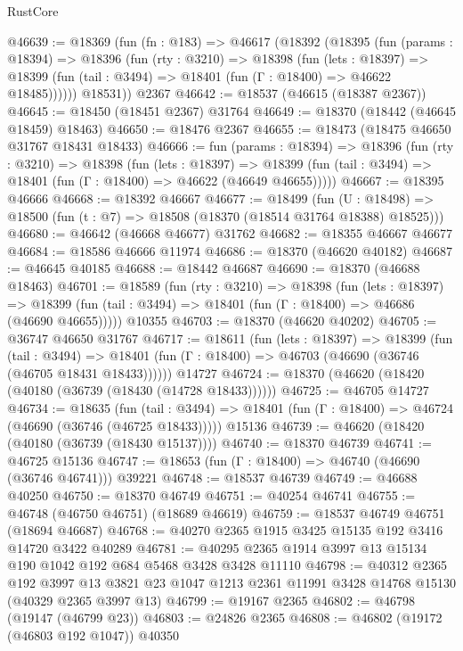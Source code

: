 \begin{lexlean}{RustCore}
\begin{coremodule}
@46639 := @18369
    (fun (fn : @183) =>
    @46617
      (@18392
        (@18395
          (fun (params : @18394) =>
          @18396
            (fun (rty : @3210) =>
            @18398
              (fun (lets : @18397) =>
              @18399 (fun (tail : @3494) => @18401 (fun (Γ : @18400) => @46622 @18485))))))
        @18531))
    @2367
@46642 := @18537 (@46615 (@18387 @2367))
@46645 := @18450 (@18451 @2367) @31764
@46649 := @18370 (@18442 (@46645 @18459) @18463)
@46650 := @18476 @2367
@46655 := @18473 (@18475 @46650 @31767 @18431 @18433)
@46666 := fun (params : @18394) =>
  @18396
    (fun (rty : @3210) =>
    @18398
      (fun (lets : @18397) =>
      @18399 (fun (tail : @3494) => @18401 (fun (Γ : @18400) => @46622 (@46649 @46655)))))
@46667 := @18395 @46666
@46668 := @18392 @46667
@46677 := @18499
    (fun (U : @18498) => @18500 (fun (t : @7) => @18508 (@18370 (@18514 @31764 @18388) @18525)))
@46680 := @46642 (@46668 @46677) @31762
@46682 := @18355 @46667 @46677
@46684 := @18586 @46666 @11974
@46686 := @18370 (@46620 @40182)
@46687 := @46645 @40185
@46688 := @18442 @46687
@46690 := @18370 (@46688 @18463)
@46701 := @18589
    (fun (rty : @3210) =>
    @18398
      (fun (lets : @18397) =>
      @18399 (fun (tail : @3494) => @18401 (fun (Γ : @18400) => @46686 (@46690 @46655)))))
    @10355
@46703 := @18370 (@46620 @40202)
@46705 := @36747 @46650 @31767
@46717 := @18611
    (fun (lets : @18397) =>
    @18399
      (fun (tail : @3494) =>
      @18401 (fun (Γ : @18400) => @46703 (@46690 (@36746 (@46705 @18431 @18433))))))
    @14727
@46724 := @18370 (@46620 (@18420 (@40180 (@36739 (@18430 (@14728 @18433))))))
@46725 := @46705 @14727
@46734 := @18635
    (fun (tail : @3494) => @18401 (fun (Γ : @18400) => @46724 (@46690 (@36746 (@46725 @18433)))))
    @15136
@46739 := @46620 (@18420 (@40180 (@36739 (@18430 @15137))))
@46740 := @18370 @46739
@46741 := @46725 @15136
@46747 := @18653 (fun (Γ : @18400) => @46740 (@46690 (@36746 @46741))) @39221
@46748 := @18537 @46739
@46749 := @46688 @40250
@46750 := @18370 @46749
@46751 := @40254 @46741
@46755 := @46748 (@46750 @46751) (@18689 @46619)
@46759 := @18537 @46749 @46751 (@18694 @46687)
@46768 := @40270 @2365 @1915 @3425 @15135 @192 @3416 @14720 @3422 @40289
@46781 := @40295 @2365 @1914 @3997 @13 @15134 @190 @1042 @192 @684 @5468 @3428 @3428 @11110
@46798 := @40312
    @2365
    @192
    @3997
    @13
    @3821
    @23
    @1047
    @1213
    @2361
    @11991
    @3428
    @14768
    @15130
    (@40329 @2365 @3997 @13)
@46799 := @19167 @2365
@46802 := @46798 (@19147 (@46799 @23))
@46803 := @24826 @2365
@46808 := @46802 (@19172 (@46803 @192 @1047)) @40350

\end{coremodule}
\end{lexlean}
